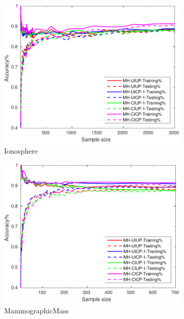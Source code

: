 \begin{figure}[ht]
\begin{subfigure}[b]{0.3\textwidth}
  	\includegraphics[width=\textwidth]{figs/PLPTF/Trees/IonosphereDownsampledFurther_Trees_MH.pdf}
  	\caption{Ionosphere}
		\label{fig:I2}
	\end{subfigure}
  \begin{subfigure}[b]{0.3\textwidth}
		\centering
  	\includegraphics[width=\textwidth]{figs/PLPTF/Trees/MammographicMassDownsampled_Trees_MH.pdf}
  	\caption{MammographicMass}
		\label{fig:Mam2}
	\end{subfigure}
	\\
  \begin{subfigure}[b]{0.3\textwidth}
		\centering

\end{subfigure}
\end{figure}
